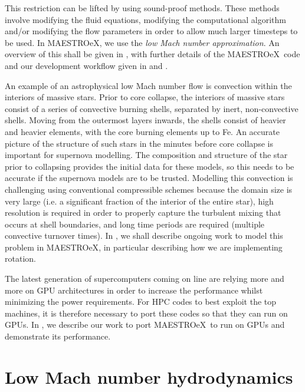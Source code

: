 \documentclass[a4paper]{jpconf}
\newcommand{\maestroex}{{\sffamily MAESTROeX}}
\begin{document}
This restriction can be lifted by using sound-proof methods. These methods involve modifying the fluid equations, modifying the computational algorithm and/or modifying the flow parameters in order to allow much larger timesteps to be used. In \maestroex, we use the \emph{low Mach number approximation}. An overview of this shall be given in , with further details of the \maestroex~code and our development workflow given in  and .  

An example of an astrophysical low Mach number flow is convection within the interiors of massive stars. Prior to core collapse, the interiors of massive stars consist of a series of convective burning shells, separated by inert, non-convective shells. Moving from the outermost layers inwards, the shells consist of heavier and heavier elements, with the core burning elements up to Fe. An accurate picture of the structure of such stars in the minutes before core collapse is important for supernova modelling. The composition and structure of the star prior to collapsing provides the initial data for these models, so this needs to be accurate if the supernova models are to be trusted. Modelling this convection is challenging using conventional compressible schemes because the domain size is very large (i.e. a significant fraction of the interior of the entire star), high resolution is required in order to properly capture the turbulent mixing that occurs at shell boundaries, and long time periods are required (multiple convective turnover times). In , we shall describe ongoing work to model this problem in \maestroex, in particular describing how we are implementing rotation. 

The latest generation of supercomputers coming on line are relying more and more on GPU architectures in order to increase the performance whilst minimizing the power requirements. For HPC codes to best exploit the top machines, it is therefore necessary to port these codes so that they can run on GPUs. In , we describe our work to port \maestroex~to run on GPUs and demonstrate its performance.


\section{Low Mach number hydrodynamics} \label{sec:low_mach_hydro}
\end{document}
